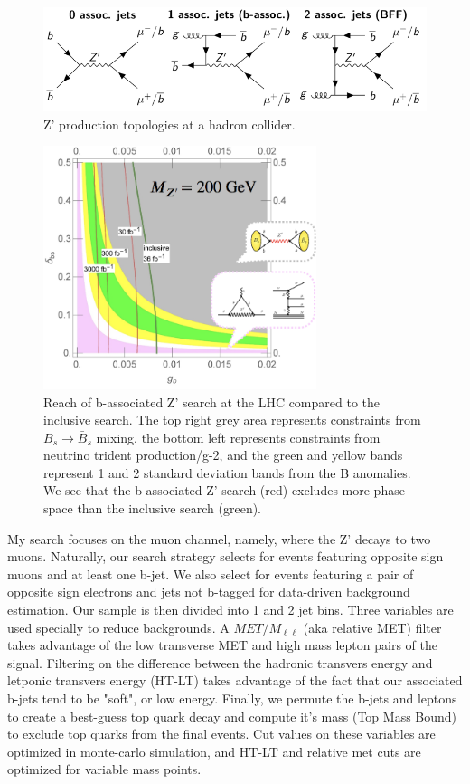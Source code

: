 \documentclass[11pt]{article}
\begin{document}
\begin{figure}
    \centering
    \includegraphics[width=\textwidth]{images/BFF_z_prime_cases.png}
    \caption{Z' production topologies at a hadron collider.}

    \label{fig:z_prime_cases}
\end{figure}


\begin{figure}
    \centering
    \includegraphics[width=8cm]{images/excluded_phase_space.png}
    \caption{Reach of b-associated Z' search at the LHC compared to the inclusive search. The top right grey area represents constraints from $B_s\rightarrow \bar{B}_s$ mixing, the bottom left represents constraints from neutrino trident production/g-2, and the green and yellow bands represent 1 and 2 standard deviation bands from the B anomalies. We see that the b-associated Z' search (red) excludes more phase space than the inclusive search (green).}
    \label{fig:exc_pahse_space}
\end{figure}


My search focuses on the muon channel, namely, where the Z' decays to two muons. Naturally, our search strategy selects for events featuring opposite sign muons and at least one b-jet. We also select for events featuring a pair of opposite sign electrons and jets not b-tagged for data-driven background estimation. Our sample is then divided into 1 and 2 jet bins. Three variables are used specially to reduce backgrounds. A $MET/M_{\ell\ell}$ (aka relative MET) filter takes advantage of the low transverse MET and high mass lepton pairs of the signal. Filtering on the difference between the hadronic transvers energy and letponic transvers energy (HT-LT) takes advantage of the fact that our associated b-jets tend to be "soft", or low energy. Finally, we permute the b-jets and leptons to create a best-guess top quark decay and compute it's mass (Top Mass Bound) to exclude top quarks from the final events. Cut values on these variables are optimized in monte-carlo simulation, and HT-LT and relative met cuts are optimized for variable mass points. 
\end{document}
